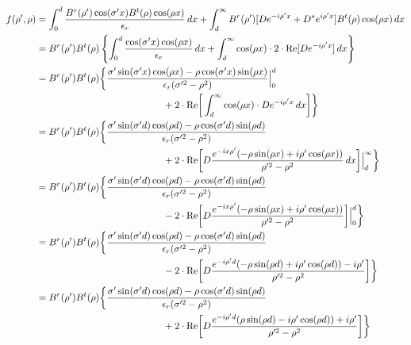 \documentclass[11pt, oneside]{article}   	%
\begin{document}
\begin{align*}
f(\rho ',\rho) &= \int_{0}^{d} \frac{B^{r}(\rho ')\cos(\sigma 'x) B^{t}(\rho)\cos(\rho x)}{\epsilon_{r}} \, dx + \int_{d}^{\infty} B^{r}(\rho ')[De^{-i\rho 'x} + D^{*}e^{i\rho 'x}] B^{t}(\rho)\cos(\rho x) \, dx \\
&= B^{r}(\rho ') B^{t}(\rho) \left\{ \int_{0}^{d} \frac{\cos(\sigma 'x) \cos(\rho x)}{\epsilon_{r}} \, dx + \int_{d}^{\infty} \cos(\rho x) \cdot 2 \cdot \text{Re}[De^{-i\rho 'x}] \, dx \right\} \\
&= B^{r}(\rho ') B^{t}(\rho) \bigg\{ \frac{\sigma '\sin(\sigma 'x) \cos(\rho x) - \rho\cos(\sigma 'x) \sin(\rho x)}{\epsilon_{r}(\sigma '^{2}-\rho^{2})} \Big|_{0}^{d}  \\
	&\hspace{132px} {} + 2 \cdot \text{Re} \bigg[  \int_{d}^{\infty} \cos(\rho x) \cdot De^{-i\rho 'x} \, dx \bigg] \bigg\} \\
&= B^{r}(\rho ') B^{t}(\rho) \bigg\{ \frac{\sigma '\sin(\sigma 'd) \cos(\rho d) - \rho\cos(\sigma 'd) \sin(\rho d)}{\epsilon_{r}(\sigma '^{2}-\rho^{2})} \\
	&\hspace{132px} {} + 2 \cdot \text{Re} \bigg[  D\frac{e^{-ix\rho '}(-\rho\sin(\rho x) + i\rho '\cos(\rho x))}{\rho '^{2} - \rho^{2}}  \, dx \bigg] \Big|_{d}^{\infty} \bigg\} \\
&= B^{r}(\rho ') B^{t}(\rho) \bigg\{ \frac{\sigma '\sin(\sigma 'd) \cos(\rho d) - \rho\cos(\sigma 'd) \sin(\rho d)}{\epsilon_{r}(\sigma '^{2}-\rho^{2})} \\
	&\hspace{132px} {} - 2 \cdot \text{Re} \bigg[  D\frac{e^{-ix\rho '}(-\rho\sin(\rho x) + i\rho '\cos(\rho x))}{\rho '^{2} - \rho^{2}} \bigg] \Big|_{0}^{d}\bigg\} \\
&= B^{r}(\rho ') B^{t}(\rho) \bigg\{ \frac{\sigma '\sin(\sigma 'd) \cos(\rho d) - \rho\cos(\sigma 'd) \sin(\rho d)}{\epsilon_{r}(\sigma '^{2}-\rho^{2})} \\
	&\hspace{132px} {} - 2 \cdot \text{Re} \bigg[  D\frac{e^{-i\rho 'd}(-\rho\sin(\rho d) + i\rho '\cos(\rho d)) - i\rho '}{\rho '^{2} - \rho^{2}} \bigg] \bigg\} \\
&= B^{r}(\rho ') B^{t}(\rho) \bigg\{ \frac{\sigma '\sin(\sigma 'd) \cos(\rho d) - \rho\cos(\sigma 'd) \sin(\rho d)}{\epsilon_{r}(\sigma '^{2}-\rho^{2})} \\
	&\hspace{132px} {} + 2 \cdot \text{Re} \bigg[  D\frac{e^{-i\rho 'd}(\rho\sin(\rho d) - i\rho '\cos(\rho d)) + i\rho '}{\rho '^{2} - \rho^{2}} \bigg] \bigg\}
\end{align*}
\end{document}
